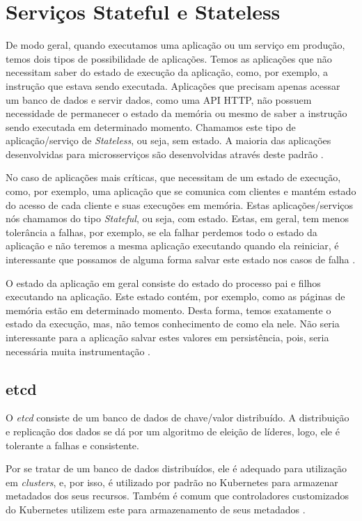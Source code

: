 \section{Serviços Stateful e Stateless}

De modo geral, quando executamos uma aplicação ou um serviço em produção,
temos dois tipos de possibilidade de aplicações. Temos as aplicações que
não necessitam saber do estado de execução da aplicação, como, por exemplo,
a instrução que estava sendo executada. Aplicações que precisam
apenas acessar um banco de dados e servir dados, como uma API HTTP, não
possuem necessidade de permanecer o estado da memória ou mesmo de saber a
instrução sendo executada em determinado momento. Chamamos este tipo de
aplicação/serviço de \textit{Stateless}, ou seja, sem estado. A maioria das
aplicações desenvolvidas para microsserviços são desenvolvidas através
deste padrão \cite{vayghan2021kubernetes}.

No caso de aplicações mais críticas, que necessitam de um estado de execução,
como, por exemplo, uma aplicação que se comunica com clientes e mantém estado
do acesso de cada cliente e suas execuções em memória. Estas aplicações/serviços
nós chamamos do tipo \textit{Stateful}, ou seja, com estado. Estas, em geral,
tem menos tolerância a falhas, por exemplo, se ela falhar perdemos todo o estado
da aplicação e não teremos a mesma aplicação executando quando ela reiniciar,
é interessante que possamos de alguma forma salvar este estado nos casos de falha
\cite{vayghan2021kubernetes}.

O estado da aplicação em geral consiste do estado do processo pai e filhos
executando na aplicação. Este estado contém, por exemplo, como as páginas
de memória estão em determinado momento. Desta forma, temos exatamente o
estado da execução, mas, não temos conhecimento de como ela nele. Não seria
interessante para a aplicação salvar estes valores em persistência, pois,
seria necessária muita instrumentação \cite{oh2018stateful}.

\subsection{etcd}

O \textit{etcd} consiste de um banco de dados de chave/valor distribuído.
A distribuição e replicação dos dados se dá por um algoritmo de eleição de
líderes, logo, ele é tolerante a falhas e consistente. \cite{etcd}

Por se tratar de um banco de dados distribuídos, ele é adequado para
utilização em \textit{clusters}, e, por isso, é utilizado por padrão no
Kubernetes para armazenar metadados dos seus recursos. Também é comum que
controladores customizados do Kubernetes utilizem este para armazenamento
de seus metadados \cite{kubernetes:etcd}.

